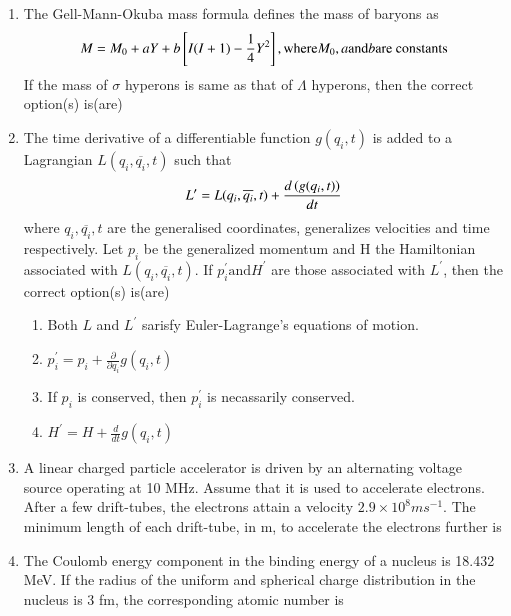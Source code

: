 \documentclass[journal]{IEEEtran}
\begin{document}
\begin{enumerate}
\begin{enumerate}
		\end{enumerate}
	\item The Gell-Mann-Okuba mass formula defines the mass of baryons as 
		$$ M = M_0 + aY + b {}\left[I(I+1) - \frac{1}{4} Y^2\right], \text{where} M_0, a \text{and} b \text{are constants}$$
		If the mass of $\sigma$ hyperons is same as that of $\Lambda$ hyperons, then the correct option(s) is(are)
		\begin{enumerate}
		\end{enumerate}
	\item The time derivative of a differentiable function $g(q_{i},t)$ is added to a Lagrangian $L(q_i, \overline{q_i},t)$ such that
		$$ L^{\prime} = L(q_i, \overline{q_i}, t) + \frac{d \left(g(q_i,t)\right)}{dt} $$
		where $q_i, \overline{q_i}, t$ are the generalised coordinates, generalizes velocities and time respectively. Let $p_i$ be the generalized momentum and H the Hamiltonian associated with $L(q_i, \overline{q_i}, t)$. If $p_{i}^{\prime} \text{and} H^{\prime}$ are those associated with $L^{\prime}$, then the correct option(s) is(are)
		\begin{enumerate}
			\item Both $L$ and $L^{\prime}$ sarisfy Euler-Lagrange's equations of motion.
			\item $p_{i}^{\prime} = p_i + \frac{\partial}{\partial q_i} g(q_i,t) $
			\item If $p_i$ is conserved, then $p_{i}^{\prime}$ is necassarily conserved.
			\item $H^{\prime} = H + \frac{d}{dt} g(q_i, t) $
		\end{enumerate}
	\item A linear charged particle accelerator is driven by an alternating voltage source operating at 10 MHz. Assume that it is used to accelerate electrons. After a few drift-tubes, the electrons attain a velocity $2.9 \times 10^8 ms^{-1}$. The minimum length of each drift-tube, in m, to accelerate the electrons further is \underline{   }
	\item The Coulomb energy component in the binding energy of a nucleus is 18.432 MeV. If the radius of the uniform and spherical charge distribution in the nucleus is 3 fm, the corresponding atomic number is \underline{  }

\end{enumerate}
\end{document}
